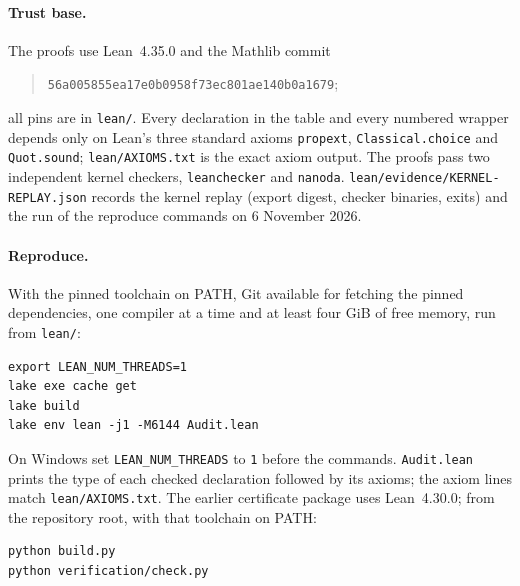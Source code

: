 \documentclass[11pt,a4paper]{article}
\theoremstyle{plain}
\theoremstyle{definition}
\theoremstyle{remark}
\begin{document}
\paragraph{Trust base.}
The proofs use Lean~4.35.0 and the Mathlib commit
\begin{quote}\small
\nolinkurl{56a005855ea17e0b0958f73ec801ae140b0a1679};
\end{quote}
all pins are in \nolinkurl{lean/}. Every declaration in the table and every
numbered wrapper depends only on Lean's three standard axioms
\nolinkurl{propext}, \nolinkurl{Classical.choice} and \nolinkurl{Quot.sound};
\nolinkurl{lean/AXIOMS.txt} is the exact axiom output. The proofs pass two
independent kernel checkers, \texttt{leanchecker} and \texttt{nanoda}.
\nolinkurl{lean/evidence/KERNEL-REPLAY.json} records the kernel replay (export digest, checker binaries, exits) and the run of the reproduce commands on 6 November 2026.

\paragraph{Reproduce.}
With the pinned toolchain on PATH, Git available for fetching the pinned
dependencies, one compiler at a time and at least four GiB of free memory,
run from \nolinkurl{lean/}:
\begin{verbatim}
export LEAN_NUM_THREADS=1
lake exe cache get
lake build
lake env lean -j1 -M6144 Audit.lean
\end{verbatim}
On Windows set \texttt{LEAN\_NUM\_THREADS} to \texttt{1} before the commands.
\texttt{Audit.lean} prints the type of each checked declaration followed by
its axioms; the axiom lines match \nolinkurl{lean/AXIOMS.txt}. The earlier
certificate package uses Lean~4.30.0; from the repository root, with that
toolchain on PATH:
\begin{verbatim}
python build.py
python verification/check.py
\end{verbatim}
\end{document}
